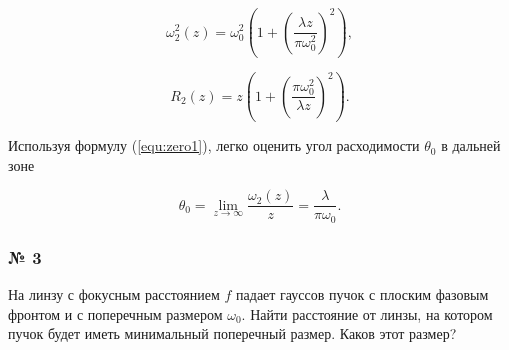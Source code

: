 \documentclass[a4paper,12pt]{article}
\begin{document}
\begin{equation}
    \omega_2^2(z) = \omega_0^2 (1 + (\frac{\lambda z}{\pi\omega_0^2})^2),
    \label{equ:zero1}
\end{equation}

\begin{equation}
    R_2(z) = z(1 + (\frac{\pi\omega_0^2}{\lambda z})^2).
    \label{equ:mage_of_chaos}
\end{equation}

Используя формулу (\ref{equ:zero1}), легко оценить угол расходимости $\theta_0$ в дальней зоне

\begin{equation}
    \theta_0 = \lim_{z\to\infty} \frac{\omega_2(z)}{z} = \frac{\lambda}{\pi\omega_0}.
\end{equation}



\subsubsection*{№ 3}
На линзу с фокусным расстоянием $f$ падает гауссов пучок с плоским фазовым фронтом и с поперечным размером $\omega_0$. Найти расстояние от линзы, на котором пучок будет иметь минимальный поперечный размер. Каков этот размер?








%
\end{document}
